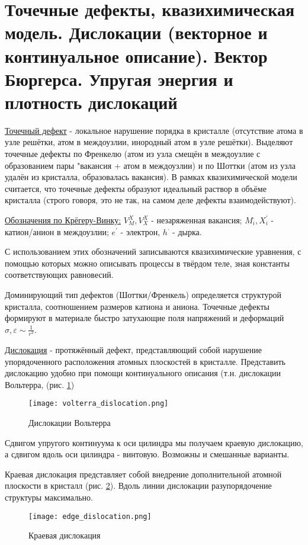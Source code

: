 \section{Точечные дефекты, квазихимическая модель. Дислокации (векторное и
континуальное описание). Вектор Бюргерса. Упругая энергия и плотность
дислокаций}
\underline{Точечный дефект} - локальное нарушение порядка в кристалле (отсутствие атома в узле решётки, атом в междоузлии, инородный атом в узле решётки). Выделяют точечные дефекты по Френкелю (атом из узла смещён в междоузлие с образованием пары "вакансия + атом в междоузлии) и по Шоттки (атом из узла удалён из кристалла, образовалась вакансия). В рамках квазихимической модели считается, что точечные дефекты образуют идеальный раствор в объёме кристалла (строго говоря, это не так, на самом деле дефекты взаимодействуют). \par
\underline{Обозначения по Крёгеру-Винку:} $V_M^X,V_X^X$ - незаряженная вакансия; $M_i^{\cdot}, X_i^{'}$ - катион/анион в междоузлии; $e^{'}$ - электрон, $h^{\cdot}$ - дырка. \par
С использованием этих обозначений записываются квазихимические уравнения, с помощью которых можно описывать процессы в твёрдом теле, зная константы соответствующих равновесий.
\par
Доминирующий тип дефектов (Шоттки/Френкель) определяется структурой кристалла, соотношением размеров катиона и аниона. Точечные дефекты формируют в материале быстро затухающие поля напряжений и деформаций $\sigma, \varepsilon \sim \frac{1}{r^3}$. \par
\underline{Дислокация} - протяжённый дефект, представляющий собой нарушение упорядоченного расположения атомных плоскостей в кристалле. Представить дислокацию удобно при помощи континуального описания (т.н. дислокации Вольтерра, (рис. \ref{fig:volterra_dislocation})
\begin{figure}[h!]
\centering
\texttt{[image: volterra\_dislocation.png]}\caption{Дислокации Вольтерра} \label{fig:volterra_dislocation}
\end{figure} 
Сдвигом упругого континуума к оси цилиндра мы получаем краевую дислокацию, а сдвигом вдоль оси цилиндра - винтовую. Возможны и смешанные варианты.\par
Краевая дислокация представляет собой внедрение дополнительной атомной плоскости в кристалл (рис. \ref{fig:edge_dislocation}). Вдоль линии дислокации разупорядочение структуры максимально.
\begin{figure}[h!]
\centering
\texttt{[image: edge\_dislocation.png]}\caption{Краевая дислокация}\label{fig:edge_dislocation}
\end{figure} 
